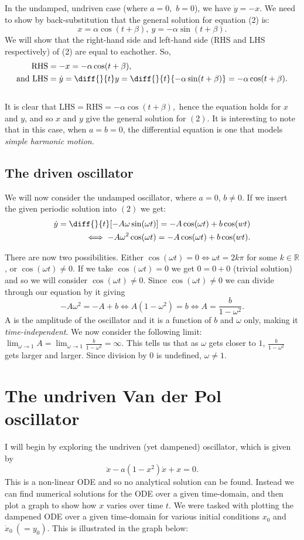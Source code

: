 \documentclass[11pt,a4paper]{amsart}
\begin{document}
In the undamped, undriven case (where $a=0,$ $b=0$), we have $\dot{y}=-x.$ We need to show by back-substitution that the general solution for equation (2) is: 
$$
x=\alpha\cos(t+\beta),\ y={-\alpha\sin(t+\beta)}.$$
We will show that the right-hand side and left-hand side (RHS and LHS respectively) of (2) are equal to eachother. So, 
\begin{align*}
\text{RHS}&={-x}={-\alpha\cos(t+\beta)},\\
\text{and}\  \text{LHS} &=  \dot{y}=\diff{}{t}y=\diff{}{t}{-\alpha\sin(t+\beta)}= {-\alpha\cos(t+\beta)}.
\end{align*}
 \\It is clear that $\text{LHS}=\text{RHS}={-\alpha}\cos(t+\beta),$ hence the equation holds for $x$ and $y$, and so $x$ and $y$ give the general solution for $(2).$
It is interesting to note that in this case, when $a=b=0$, the differential equation is one that models \textit{simple harmonic motion}.
\subsection*{The driven oscillator}
We will now consider the undamped oscillator, where $a=0$, $b\neq0$. If we insert the given periodic solution into $(2)$ we get:
\begin{align*}
\dot{y} = \diff{}{t} [{-A}\omega\sin(\omega t)]={-A}\cos(\omega t)+b\cos(wt) \\ 
\iff {-A}\omega^2\cos(\omega t)={-A}\cos(\omega t)+b\cos(wt).
\end{align*}

There are now two possibilities. Either $\cos(\omega t) = 0 \iff \omega t=2k\pi$ for some $k\in\mathbb{R}$, or $\cos(\omega t) \neq 0$. If we take $\cos(\omega t) = 0$ we get $0=0+0$ (trivial solution) and so we will consider $\cos(\omega t)\neq 0.$ Since $\cos(\omega t) \neq 0$ we can divide through our equation by it giving $${-A}\omega^2={-A}+b\iff A(1-\omega^2)=b \iff A=\frac{b}{1-\omega^2}.$$
A is the amplitude of the oscillator and it is a function of $b$ and $\omega$ only, making it \textit{time-independent}. We now consider the following limit: $\lim_{\omega \to 1} A = \lim_{\omega \to 1} \frac{b}{1-\omega^2} =\infty.$ This tells us that as $\omega$ gets closer to $1$, $\frac{b}{1-\omega^2}$ gets larger and larger. Since division by $0$ is undefined, $\omega \neq 1$.
\\

\section*{The undriven Van der Pol oscillator}
I will begin by exploring the undriven (yet dampened) oscillator, which is given by $$\ddot{x}-a(1-x^2)\dot{x}+x=0.$$ This is a non-linear ODE and so no analytical solution can be found. Instead we can find numerical solutions for the ODE over a given time-domain, and then plot a graph to show how $x$ varies over time $t$. We were tasked with plotting the dampened ODE over a given time-domain for various initial conditions $x_{0}$ and $\dot{x}_{0}\ (=y_0)$. This is illustrated in the graph below:
\end{document}
